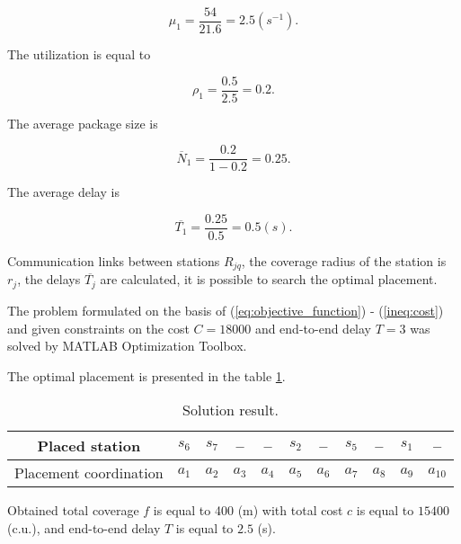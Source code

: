 \begin{displaymath}
  \label{eq:service_time_evaluation}
  \mu_1 = \frac{54}{21.6} = 2.5 (s^{-1}).
\end{displaymath}

The utilization is equal to

\begin{displaymath}
  \label{eq:rho_evaluation}
  \rho_1 = \frac{0.5}{2.5} = 0.2.
\end{displaymath}

The average package size is

\begin{displaymath}
  \label{eq:N_evaluation}
  \overline N_1 = \frac{0.2}{1 - 0.2} = 0.25.
\end{displaymath}

The average delay is

\begin{displaymath}
  \label{eq:node_delay_evaluation}
  \overline {T_1} = \frac{0.25}{0.5} = 0.5 (s).
\end{displaymath}

Communication links between stations $R_{jq}$, the coverage radius of the station is $r_j$, the delays $\overline{T_j}$ are calculated, it is possible to search the optimal placement.

The problem formulated on the basis of (\ref{eq:objective_function}) - (\ref{ineq:cost}) and given constraints on the cost $C = 18000$ and end-to-end delay $T = 3$ was solved by MATLAB Optimization Toolbox.

The optimal placement is presented in the table \ref{tab:solution}.

\begin{table}[h!]\begin{center}
  \begin{tabular}{|c||c|c|c|c|c|c|c|c|c|c|} \hline
      
      Placed station & $s_6$ & $s_7$ & -- & -- & $s_2$ & -- &  $s_5$ & -- & $s_1$ & -- \\ \hline

      Placement coordination & $a_1$ &  $a_2$ & $a_3$ & $a_4$ & $a_5$ & $a_6$ & $a_7$ & $a_8$ & $a_9$ & $a_{10}$ \\  \hline

\end{tabular}\caption{Solution result.}\label{tab:solution}
\end{center}\end{table}
Obtained total coverage $f$ is equal to 400 (m) with total cost $c$ is equal to $15400$ (c.u.), and end-to-end delay $T$ is equal to $ 2.5$ (s).

